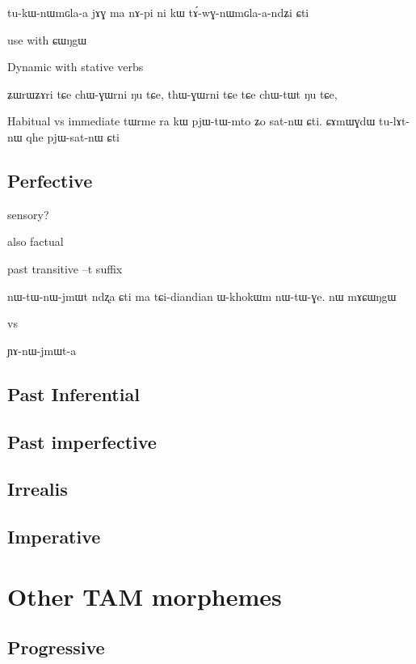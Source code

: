\documentclass[oldfontcommands,oneside,a4paper,11pt]{article}
\newcommand{\ipa}[1]{{\phon \mbox{#1}}} %
\begin{document}
\ipa{tu-kɯ-nɯmɢla-a}  	\ipa{jɤɣ}  	\ipa{ma}  	\ipa{nɤ-pi}  	\ipa{ni}  	\ipa{kɯ}  	\ipa{tɤ́-wɣ-nɯmɢla-a-ndʑi}  	\ipa{ɕti}  




use with \ipa{ɕɯŋgɯ} \citet{jacques14linking}


 Dynamic with stative verbs
 
\ipa{ʑɯrɯʑɤri}  	\ipa{tɕe}  	\ipa{chɯ-ɣɯrni}  	\ipa{ŋu}  	\ipa{tɕe,}  \ipa{thɯ-ɣɯrni}  	\ipa{tɕe}  	\ipa{tɕe}  	\ipa{chɯ-tɯt}  	\ipa{ŋu}  	\ipa{tɕe,}  




Habitual vs immediate
\ipa{tɯrme} 	\ipa{ra} 	\ipa{kɯ} 	\ipa{pjɯ-tɯ-mto} 	\ipa{ʑo} 	\ipa{sat-nɯ} 	\ipa{ɕti.} 
\ipa{ɕɤmɯɣdɯ} 	\ipa{tu-lɤt-nɯ} 	\ipa{qhe} 	\ipa{pjɯ-sat-nɯ} 	\ipa{ɕti} 

\subsection{Perfective}
sensory?

also factual

past transitive \ipa{--t} suffix 


\ipa{nɯ-tɯ-nɯ-jmɯt} 	\ipa{ndʐa} 	\ipa{ɕti} 	\ipa{ma} 	\ipa{tɕi-diandian} 	\ipa{ɯ-khokɯm} 	\ipa{nɯ-tɯ-ɣe.} 	\ipa{nɯ} 	\ipa{mɤɕɯŋgɯ} 


vs

\ipa{ɲɤ-nɯ-jmɯt-a}
\subsection{Past Inferential}

\subsection{Past imperfective}

\subsection{Irrealis}
\citet{jackson07irrealis}
\subsection{Imperative}

\section{Other TAM morphemes}
\subsection{Progressive}
\end{document}
